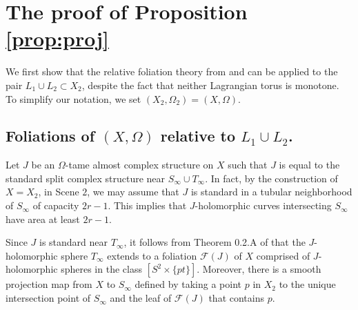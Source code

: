 \documentclass[12pt]{amsart}
\newtheorem{corollary}[theorem]{Corollary}
\theoremstyle{definition}
\begin{document}









\section{The proof of Proposition \ref{prop:proj}}\label{foliation}

We first show that the relative foliation theory from \cite{ivriit} and \cite{rgi} can be applied to the pair $L_1 \cup L_2 \subset X_2$, despite the fact that neither Lagrangian torus is monotone. To simplify our notation, we set $(X_2,\Omega_2) = (X,\Omega)$.

\subsection{Foliations of $(X, \Omega)$ relative to $L_1 \cup L_2$.}\label{subsec:morefol} 

Let $J$ be an $\Omega$-tame almost complex structure on $X$ such that $J$ is equal to the standard split complex structure near $S_{\infty} \cup T_{\infty}$. 
In fact, by the construction of $X=X_2$, in Scene $2$, we may assume that $J$ is standard in a tubular neighborhood of $S_{\infty}$ of capacity $2r-1$. This implies that $J$-holomorphic curves intersecting $S_{\infty}$ have area at least $2r-1$.

Since $J$ is standard near $T_{\infty}$, it follows from Theorem 0.2.A of \cite{gr} that the $J$-holomorphic sphere $T_{\infty}$ extends to a foliation $\mathcal{F}(J)$ of $X$ comprised of $J$-holomorphic spheres in the class $[S^2 \times \{pt\}]$. %
Moreover, there is a smooth projection map from $X$ to $S_{\infty}$ defined by taking a point $p$ in $X_2$ to the unique intersection point of $S_{\infty}$ and the leaf of $\mathcal{F}(J)$ that contains $p$.
\end{document}
